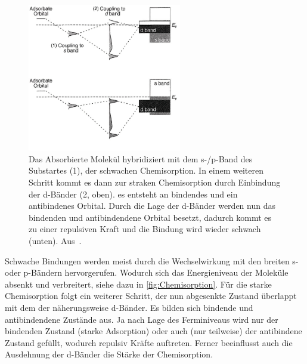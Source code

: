             \begin{figure}
                \centering
                \includegraphics[width=0.6\textwidth]{./content/pictures/Chemisorption2.PNG}
                \caption{Das Absorbierte Molekül hybridiziert mit dem s-/p-Band des Substartes (1), der schwachen Chemisorption.
                In einem weiteren Schritt kommt es dann zur straken Chemisorption durch Einbindung der d-Bänder (2, oben). es entsteht an bindendes und ein antibindenes Orbital.
                Durch die Lage der d-Bänder werden nun das bindenden und antibindendene Orbital besetzt, dadurch kommt es zu einer repulsiven Kraft und die Bindung wird wieder schwach (unten). Aus~\cite{IF_1}.}
                \label{fig:Chemisorption}
            \end{figure}
            Schwache Bindungen werden meist durch die Wechselwirkung mit den breiten s- oder p-Bändern hervorgerufen.
            Wodurch sich das Energieniveau der Moleküle absenkt und verbreitert, siehe dazu in \autoref{fig:Chemisorption}.
            Für die starke Chemisorption folgt ein weiterer Schritt, der nun abgesenkte Zustand überlappt mit dem der näherungsweise d-Bänder.
            Es bilden sich bindende und antibindendene Zustände aus.
            Ja nach Lage des Ferminiveaus wird nur der bindenden Zustand (starke Adsorption) oder auch (nur teilweise) der antibindene Zustand gefüllt, wodurch repulsiv Kräfte auftreten.
            Ferner beeinflusst auch die Ausdehnung der d-Bänder die Stärke der Chemisorption.
        
